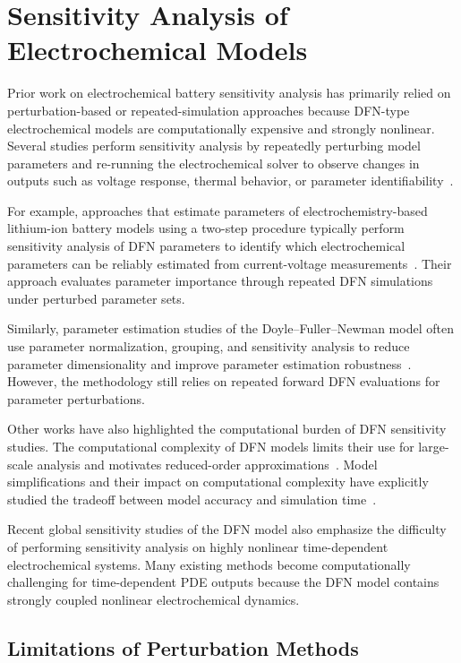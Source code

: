 \section{Sensitivity Analysis of Electrochemical Models}
\label{sec:lit_sensitivity}

Prior work on electrochemical battery sensitivity analysis has primarily relied on perturbation-based or repeated-simulation approaches because DFN-type electrochemical models are computationally expensive and strongly nonlinear. Several studies perform sensitivity analysis by repeatedly perturbing model parameters and re-running the electrochemical solver to observe changes in outputs such as voltage response, thermal behavior, or parameter identifiability~\cite{ParamSens}.

For example, approaches that estimate parameters of electrochemistry-based lithium-ion battery models using a two-step procedure typically perform sensitivity analysis of DFN parameters to identify which electrochemical parameters can be reliably estimated from current-voltage measurements~\cite{ParamEst}. Their approach evaluates parameter importance through repeated DFN simulations under perturbed parameter sets.

Similarly, parameter estimation studies of the Doyle--Fuller--Newman model often use parameter normalization, grouping, and sensitivity analysis to reduce parameter dimensionality and improve parameter estimation robustness~\cite{SurrogateAging}. However, the methodology still relies on repeated forward DFN evaluations for parameter perturbations.

Other works have also highlighted the computational burden of DFN sensitivity studies. The computational complexity of DFN models limits their use for large-scale analysis and motivates reduced-order approximations~\cite{Jokar2016}. Model simplifications and their impact on computational complexity have explicitly studied the tradeoff between model accuracy and simulation time~\cite{Moura2017}.

Recent global sensitivity studies of the DFN model also emphasize the difficulty of performing sensitivity analysis on highly nonlinear time-dependent electrochemical systems. Many existing methods become computationally challenging for time-dependent PDE outputs because the DFN model contains strongly coupled nonlinear electrochemical dynamics.

\subsection{Limitations of Perturbation Methods}
\label{ssec:lit_perturbation_limits}


